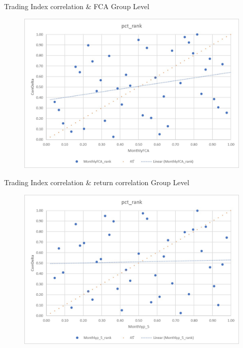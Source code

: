 \documentclass{beamer}
\begin{document}
	
	\begin{frame}{Trading Index correlation \&  FCA} {Group Level}
		
		
		\begin{figure}
			\centering
			\includegraphics[width=0.75\linewidth]{../Trade/CorrFCA}
			\label{fig:CorrFCA}
		\end{figure}
	\end{frame}
	
	
	\begin{frame}{Trading Index correlation \&  return correlation} {Group Level}
		
		
		\begin{figure}
			\centering
			\includegraphics[width=0.75\linewidth]{../Trade/CorrIndexCorr}
			\label{fig:CorrIndexCorr}
		\end{figure}
	\end{frame}
	
\end{document}
